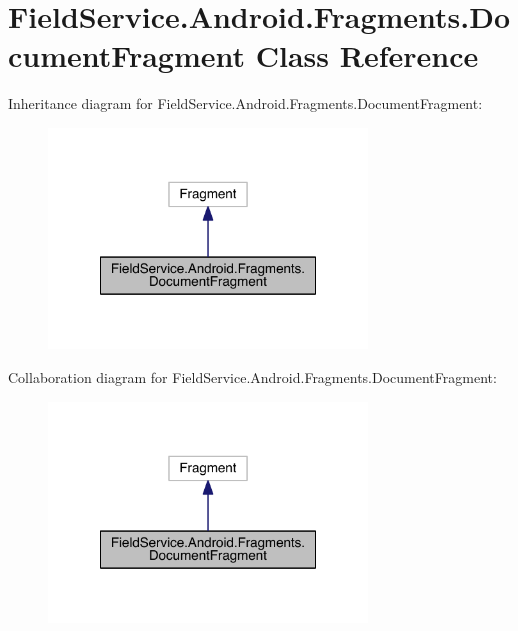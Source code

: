 \hypertarget{class_field_service_1_1_android_1_1_fragments_1_1_document_fragment}{\section{Field\+Service.\+Android.\+Fragments.\+Document\+Fragment Class Reference}
\label{class_field_service_1_1_android_1_1_fragments_1_1_document_fragment}
}


Inheritance diagram for Field\+Service.\+Android.\+Fragments.\+Document\+Fragment\+:
\nopagebreak
\begin{figure}[H]
\begin{center}
\leavevmode
\includegraphics[width=240pt]{class_field_service_1_1_android_1_1_fragments_1_1_document_fragment__inherit__graph}
\end{center}
\end{figure}


Collaboration diagram for Field\+Service.\+Android.\+Fragments.\+Document\+Fragment\+:
\nopagebreak
\begin{figure}[H]
\begin{center}
\leavevmode
\includegraphics[width=240pt]{class_field_service_1_1_android_1_1_fragments_1_1_document_fragment__coll__graph}
\end{center}
\end{figure}
